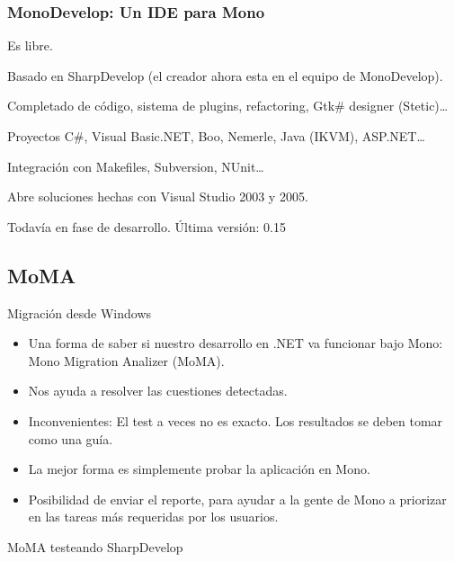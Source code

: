 \documentclass{beamer}
\begin{document}
\begin{frame}
  \frametitle{MonoDevelop: Un IDE para Mono}

  \begin{itemize}
    \begin{small}
      \item Es libre.
      \item Basado en SharpDevelop (el creador ahora esta en el equipo de MonoDevelop).
      \item Completado de código, sistema de plugins, refactoring, Gtk\# designer (Stetic)\ldots
      \item Proyectos C\#, Visual Basic.NET, Boo, Nemerle, Java (IKVM), ASP.NET\ldots
      \item Integración con Makefiles, Subversion, NUnit\ldots
      \item Abre soluciones hechas con Visual Studio 2003 y 2005.
      \item \alert{Todavía en fase de desarrollo. Última versión: 0.15}
    \end{small}
  \end{itemize}
\end{frame}


\subsection{MoMA}

\begin{frame}{Migración desde Windows}
  \begin{itemize}
    \item Una forma de saber si nuestro desarrollo en .NET va funcionar
      bajo Mono: Mono Migration Analizer (MoMA).
    \item Nos ayuda a resolver las cuestiones detectadas.
    \item \alert{Inconvenientes:} El test a veces no es exacto. Los resultados
      se deben tomar como una guía.
    \item La mejor forma es simplemente probar la aplicación en Mono.
    \item Posibilidad de enviar el reporte, para ayudar a la gente de Mono
      a priorizar en las tareas más requeridas por los usuarios.
  \end{itemize}
\end{frame}

\begin{frame}[plain]{MoMA testeando SharpDevelop}
  \begin{centering}
  \end{centering}
\end{frame}
\end{document}
